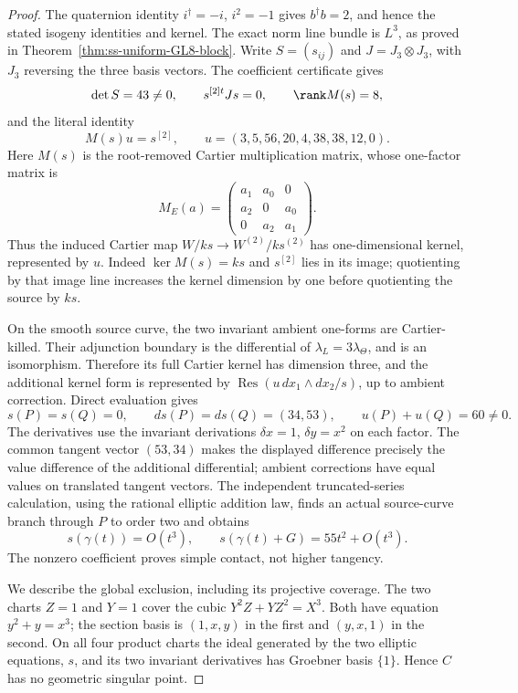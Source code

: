 \begin{proof}
The quaternion identity $i^\dagger=-i$, $i^2=-1$ gives
$b^\dagger b=2$, and hence the stated isogeny identities and kernel.
The exact norm line bundle is $L^3$, as proved in
Theorem~\ref{thm:ss-uniform-GL8-block}.
Write $S=(s_{ij})$ and $J=J_3\otimes J_3$, with $J_3$ reversing the
three basis vectors. The coefficient certificate gives
\[
 \det S=43\ne0,\qquad s^{[2]t}Js=0,\qquad\rank M(s)=8,
\]
and the literal identity
\[
 M(s)u=s^{[2]},\qquad
             u=(3,5,56,20,4,38,38,12,0).
\]
Here $M(s)$ is the root-removed Cartier multiplication matrix,
whose one-factor matrix is
\[
 M_E(a)=\begin{pmatrix}a_1&a_0&0\\a_2&0&a_0\\0&a_2&a_1\end{pmatrix}.
\]
Thus the induced Cartier map $W/ks\to W^{(2)}/ks^{(2)}$ has
one-dimensional kernel, represented by $u$.
Indeed $\ker M(s)=ks$ and $s^{[2]}$ lies in its image; quotienting
by that image line increases the kernel dimension by one before
quotienting the source by $ks$.

On the smooth source curve, the two invariant ambient one-forms
are Cartier-killed. Their adjunction boundary is the differential
of $\lambda_L=3\lambda_\Theta$, and is an isomorphism.
Therefore its full Cartier kernel has dimension three, and the
additional kernel form is represented by
$\operatorname{Res}(u\,dx_1\wedge dx_2/s)$, up to ambient correction.
Direct evaluation gives
\[
 s(P)=s(Q)=0,\qquad ds(P)=ds(Q)=(34,53),\qquad
                         u(P)+u(Q)=60\ne0.
\]
The derivatives use the invariant derivations
$\delta x=1$, $\delta y=x^2$ on each factor. The common tangent
vector $(53,34)$ makes the displayed difference precisely the
value difference of the additional differential; ambient corrections
have equal values on translated tangent vectors.
The independent truncated-series calculation, using the rational
elliptic addition law, finds an actual source-curve branch through
$P$ to order two and obtains
\[
                 s(\gamma(t))=O(t^3),\qquad
                 s(\gamma(t)+G)=55t^2+O(t^3).
\]
The nonzero coefficient proves simple contact, not higher tangency.

We describe the global exclusion, including its projective coverage.
The two charts $Z=1$ and $Y=1$ cover the cubic
$Y^2Z+YZ^2=X^3$. Both have equation $y^2+y=x^3$; the section
basis is $(1,x,y)$ in the first and $(y,x,1)$ in the second.
On all four product charts the ideal generated by the two elliptic
equations, $s$, and its two invariant derivatives has Groebner basis
$\{1\}$. Hence $C$ has no geometric singular point.


\end{proof}
